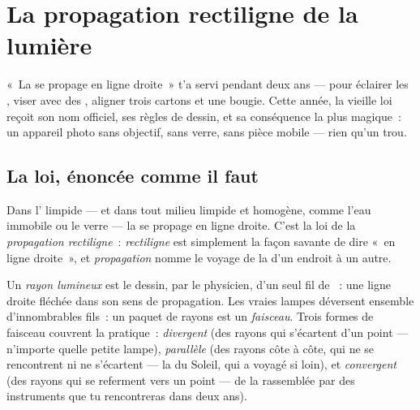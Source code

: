 \chapter{La propagation rectiligne de la lumière}\label{ch:g6:light-propagation}

«~La  se propage en ligne droite~» t'a servi pendant deux ans
--- pour éclairer les , viser avec des , aligner trois
cartons et une bougie. Cette année, la vieille loi reçoit son nom
officiel, ses règles de dessin, et sa conséquence la plus magique~:
un appareil photo sans objectif, sans verre, sans pièce mobile ---
rien qu'un trou.

\section{La loi, énoncée comme il faut}

\begin{proposition}\label{prop:g6:light-propagation:law}
Dans l' limpide --- et dans tout milieu limpide et homogène,
comme l'eau immobile ou le verre --- la  se propage en ligne
droite. C'est la loi de la \emph{propagation
rectiligne}~: \emph{rectiligne} est
simplement la façon savante de dire «~en ligne droite~», et
\emph{propagation} nomme le voyage de la  d'un endroit à un
autre.
\end{proposition}

\begin{definition}\label{def:g6:light-propagation:ray}
Un \emph{rayon lumineux} est le dessin, par le
physicien, d'un seul fil de ~: une ligne droite fléchée dans
son sens de propagation. Les vraies lampes déversent ensemble
d'innombrables fils~: un paquet de rayons est un
\emph{faisceau}. Trois formes de faisceau couvrent la
pratique~: \emph{divergent} (des rayons qui s'écartent d'un point ---
n'importe quelle petite lampe), \emph{parallèle} (des rayons côte à
côte, qui ne se rencontrent ni ne s'écartent --- la  du
Soleil, qui a voyagé si loin), et \emph{convergent} (des rayons qui
se referment vers un point --- de la  rassemblée par des
instruments que tu rencontreras dans deux ans).
\end{definition}

